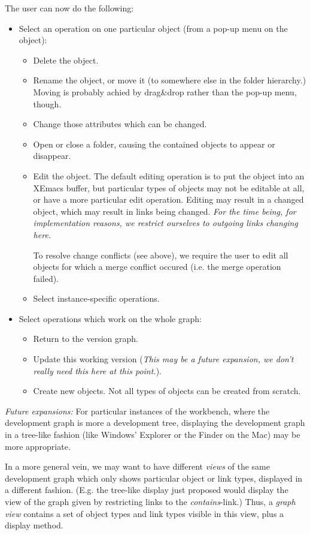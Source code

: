 \documentclass[a4paper]{article}
\begin{document}
The user can now do the following:
\begin{itemize}
\item Select an operation on one particular object (from a pop-up menu
  on the object): 
  \begin{itemize}
  \item Delete the object.
  \item Rename the object, or move it (to somewhere else in the folder
    hierarchy.) Moving is probably achied by drag\&drop rather than
    the pop-up menu, though.
  \item Change those attributes which can be changed.
  \item Open or close a folder, causing the contained objects to
    appear or disappear.
  \item Edit the object. The default editing operation is to put the
    object into an XEmacs buffer, but particular types of objects may
    not be editable at all, or have a more particular edit operation.
    Editing may result in a changed object, which may result in links
    being changed. \emph{For the time being, for implementation
      reasons, we restrict ourselves to outgoing links changing here.}
    
    To resolve change conflicts (see above), we require the user to
    edit all objects for which a merge conflict occured (i.e. the
    merge operation failed).
  \item Select instance-specific operations.
  \end{itemize}
\item Select operations which work on the whole graph:
  \begin{itemize}
  \item Return to the version graph.
  \item Update this working version (\emph{This may be a future
      expansion, we don't really need this here at this point.}).
  \item Create new objects. Not all types of objects can be created
    from scratch.
  \end{itemize}
\end{itemize}

\emph{Future expansions:} For particular instances of the workbench,
where the development graph is more a development tree, displaying the
development graph in a tree-like fashion (like Windows' Explorer or
the Finder on the Mac) may be more appropriate. 

In a more general vein, we may want to have different \emph{views} of
the same development graph which only shows particular object or link
types, displayed in a different fashion. (E.g. the tree-like display
just proposed would display the view of the graph given by restricting
links to the \emph{contains}-link.) Thus, a \emph{graph view} contains
a set of object types and link types visible in this view, plus a
display method.
\end{document}
